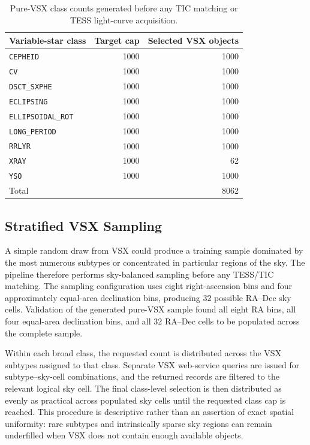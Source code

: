\documentclass[linenumbers]{aastex701}
\begin{document}
\begin{table}[ht]
\centering
\caption{Pure-VSX class counts generated before any TIC matching or TESS light-curve acquisition. }
\label{tab:class_taxonomy}
\begin{tabular}{lrr}
\hline\hline
Variable-star class & Target cap & Selected VSX objects \\
\hline
\texttt{CEPHEID} & 1000 & 1000 \\
\texttt{CV} & 1000 & 1000 \\
\texttt{DSCT\_SXPHE} & 1000 & 1000 \\
\texttt{ECLIPSING} & 1000 & 1000 \\
\texttt{ELLIPSOIDAL\_ROT} & 1000 & 1000 \\
\texttt{LONG\_PERIOD} & 1000 & 1000 \\
\texttt{RRLYR} & 1000 & 1000 \\
\texttt{XRAY} & 1000 & 62 \\
\texttt{YSO} & 1000 & 1000 \\
\hline
Total & & 8062 \\
\hline
\end{tabular}
\end{table}


\subsection{Stratified VSX Sampling}
\label{subsec:vsx_sampling}

A simple random draw from VSX could produce a training sample dominated by the most numerous subtypes or concentrated in particular regions of the sky. The pipeline therefore performs sky-balanced sampling before any TESS/TIC matching. The sampling configuration uses eight right-ascension bins and four approximately equal-area declination bins, producing 32 possible RA--Dec sky cells. Validation of the generated pure-VSX sample found all eight RA bins, all four equal-area declination bins, and all 32 RA--Dec cells to be populated across the complete sample.

Within each broad class, the requested count is distributed across the VSX subtypes assigned to that class. Separate VSX web-service queries are issued for subtype--sky-cell combinations, and the returned records are filtered to the relevant logical sky cell. The final class-level selection is then distributed as evenly as practical across populated sky cells until the requested class cap is reached. This procedure is descriptive rather than an assertion of exact spatial uniformity: rare subtypes and intrinsically sparse sky regions can remain underfilled when VSX does not contain enough available objects.
\end{document}
